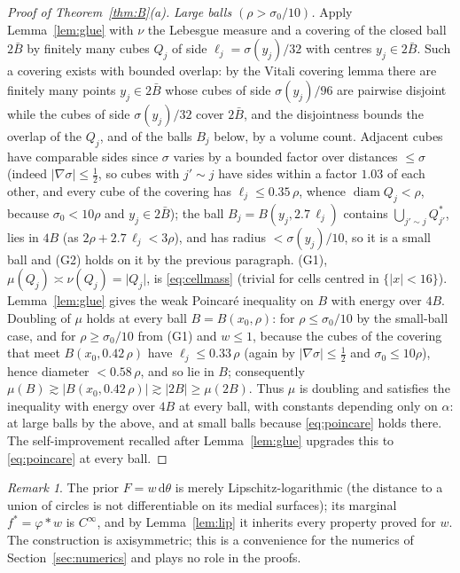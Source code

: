 \documentclass[11pt]{amsart}
\newcommand{\dd}{\,\mathrm{d}}
\newcommand{\abs}[1]{\lvert #1\rvert}
\theoremstyle{plain}
\theoremstyle{definition}
\theoremstyle{remark}
\newtheorem{remark}[theorem]{Remark}
\begin{document}
\begin{proof}[Proof of Theorem~\ref{thm:B}(a)]
\emph{Large balls $(\rho>\sigma_0/10)$.} Apply Lemma~\ref{lem:glue} with $\nu$ the
Lebesgue measure and a covering of the closed ball $2\bar B$ by finitely many
cubes $Q_j$ of side $\ell_j=\sigma(y_j)/32$ with centres $y_j\in2\bar B$. Such a
covering exists with bounded overlap: by the Vitali covering lemma there are
finitely many points $y_j\in2\bar B$ whose cubes of side $\sigma(y_j)/96$ are
pairwise disjoint while the cubes of side $\sigma(y_j)/32$ cover $2\bar B$, and
the disjointness bounds the overlap of the $Q_j$, and of the balls $B_j$
below, by a volume count. Adjacent cubes have
comparable sides since $\sigma$ varies by a bounded factor over distances
$\le\sigma$ (indeed $\abs{\nabla\sigma}\le\tfrac12$, so cubes with $j'\sim j$ have
sides within a factor $1.03$ of each other, and every cube of the covering has
$\ell_j\le0.35\,\rho$, whence $\operatorname{diam}Q_j<\rho$, because
$\sigma_0<10\rho$ and $y_j\in2\bar B$); the ball
$B_j=B(y_j,2.7\,\ell_j)$ contains $\bigcup_{j'\sim j}Q_{j'}^*$, lies in $4B$
(as $2\rho+2.7\,\ell_j<3\rho$), and has radius $<\sigma(y_j)/10$, so it is a
small ball and (G2) holds on it by the previous paragraph. (G1),
$\mu(Q_j)\asymp\nu(Q_j)=\abs{Q_j}$, is
\eqref{eq:cellmass} (trivial for cells centred in $\{\abs x<16\}$).
Lemma~\ref{lem:glue} gives the weak Poincar\'e inequality on
$B$ with energy over $4B$. Doubling of $\mu$ holds at every ball
$B=B(x_0,\rho)$: for $\rho\le\sigma_0/10$ by the small-ball case, and for
$\rho\ge\sigma_0/10$ from (G1) and $w\le1$, because the cubes of the covering
that meet $B(x_0,0.42\,\rho)$ have $\ell_j\le0.33\,\rho$ (again by
$\abs{\nabla\sigma}\le\tfrac12$ and $\sigma_0\le10\rho$), hence diameter
$<0.58\,\rho$, and so lie in $B$; consequently
$\mu(B)\gtrsim\abs{B(x_0,0.42\,\rho)}\gtrsim\abs{2B}\ge\mu(2B)$.
Thus $\mu$ is doubling and satisfies the inequality with energy over $4B$ at
every ball, with constants depending only on $\alpha$: at large balls by the
above, and at small balls because \eqref{eq:poincare} holds there. The
self-improvement recalled after Lemma~\ref{lem:glue} upgrades this to
\eqref{eq:poincare} at every ball.
\end{proof}

\begin{remark}
The prior $F=w\dd\theta$ is merely Lipschitz-logarithmic (the distance to a
union of circles is not differentiable on its medial surfaces); its marginal
$f^*=\varphi*w$ is $C^\infty$, and by Lemma~\ref{lem:lip} it inherits every
property proved for $w$. The construction is axisymmetric; this is a
convenience for the numerics of Section~\ref{sec:numerics} and plays no role in
the proofs.
\end{remark}
\end{document}
